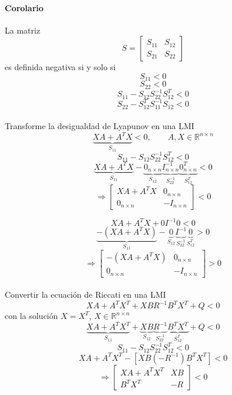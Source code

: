 \clearpage
\begin{flushright}
\end{flushright}

\paragraph{Corolario}
La matriz
\[
  S=
  \begin{bmatrix}
    S_{11} & S_{12}\\
    S_{21} & S_{22}
  \end{bmatrix}
\]
es definida negativa si y solo si
\[
  S_{11}<0
\]
\[
  S_{22}<0
\]
\[
  S_{11}-S_{12}S_{22}^{-1}S_{12}^{T}<0
\]
\[
  S_{22}-S_{12}^{T}S_{11}^{-1}S_{12}<0
\]

\paragraph{}
Transforme la desigualdad de Lyapunov en una LMI
\[
  \underbrace{XA+A^{T}X}_{S_{11}}<0,
  \qquad A,X\in\mathbb{R}^{n\times n}
\]
\[
  S_{11}-S_{12}S_{22}^{-1}S_{12}^{T}<0
\]
\[
  \underbrace{XA+A^{T}X}_{S_{11}}
  -\underbrace{0_{n\times n}}_{S_{12}}
  \underbrace{I_{n\times n}^{-1}}_{S_{22}^{-1}}
  \underbrace{0_{n\times n}^{T}}_{S_{12}^{T}}<0
\]
\[
  \Rightarrow
  \begin{bmatrix}
    XA+A^{T}X & 0_{n\times n}\\
    0_{n\times n} & -I_{n\times n}
  \end{bmatrix}<0
\]

\[
  XA+A^{T}X+0I^{-1}0<0
\]
\[
  \underbrace{-(XA+A^{T}X)}_{S_{11}}
  -\underbrace{0}_{S_{12}}
  \underbrace{I^{-1}}_{S_{22}^{-1}}
  \underbrace{0}_{S_{12}^{T}}>0
\]
\[
  \Rightarrow
  \begin{bmatrix}
    -(XA+A^{T}X) & 0_{n\times n}\\
    0_{n\times n} & -I_{n\times n}
  \end{bmatrix}>0
\]

\paragraph{}
Convertir la ecuación de Riccati en una LMI
\[
  XA+A^{T}X^{T}+XBR^{-1}B^{T}X^{T}+Q<0
\]
con la solución $X=X^{T}$, $X\in\mathbb{R}^{n\times n}$
\[
  \underbrace{XA+A^{T}X^{T}}_{S_{11}}
  +\underbrace{XB}_{S_{12}}
  \underbrace{R^{-1}}_{S_{22}^{-1}}
  \underbrace{B^{T}X^{T}}_{S_{12}^{T}}+{Q}<0
\]
\[
  S_{11}-S_{12}S_{22}^{-1}S_{12}^{T}<0
\]
\[
  XA+A^{T}X^{T}
  -[XB(-R^{-1})B^{T}X^{T}]<0
\]
\[
  \Rightarrow
  \begin{bmatrix}
    XA+A^{T}X^{T} & XB\\
    B^{T}X^{T} & -R
  \end{bmatrix}<0
\]

